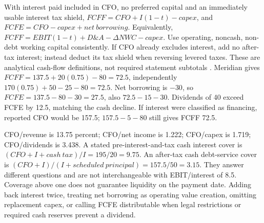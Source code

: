 \begin{qfmethod}\label{meth:free-cash-flow-and-cash-coverage}
 With interest paid included in CFO, no preferred capital and an immediately usable interest tax shield, $FCFF=CFO+I(1-t)-capex$, and $FCFE=CFO-capex+net\ borrowing$. Equivalently, $FCFF=EBIT(1-t)+D\&A-\Delta NWC-capex$. Use operating, noncash, non-debt working capital consistently. If CFO already excludes interest, add no after-tax interest; instead deduct its tax shield when reversing levered taxes. These are analytical cash-flow definitions, not required statement subtotals \citep[chap.~5, solutions~29--30, PDF p.~188]{statement-analysis-workbook-2020}.
 Meridian gives $FCFF=137.5+20(0.75)-80=72.5$, independently $170(0.75)+50-25-80=72.5$. Net borrowing is $-30$, so $FCFE=137.5-80-30=27.5$, also $72.5-15-30$. Dividends of 40 exceed FCFE by 12.5, matching the cash decline. If interest were classified as financing, reported CFO would be 157.5; $157.5-5-80$ still gives FCFF 72.5.

CFO/revenue is 13.75 percent; CFO/net income is 1.222; CFO/capex is 1.719; CFO/dividends is 3.438. A stated pre-interest-and-tax cash interest cover is $(CFO+I+cash\ tax)/I=195/20=9.75$. An after-tax cash debt-service cover is $(CFO+I)/(I+scheduled\ principal)=157.5/50=3.15$. They answer different questions and are not interchangeable with EBIT/interest of 8.5. Coverage above one does not guarantee liquidity on the payment date.
 Adding back interest twice, treating net borrowing as operating value creation, omitting replacement capex, or calling FCFE distributable when legal restrictions or required cash reserves prevent a dividend.
\end{qfmethod}
